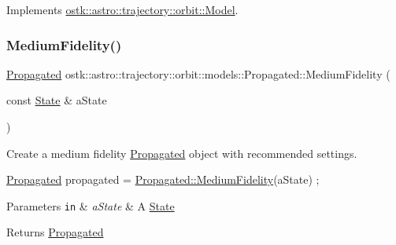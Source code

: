 Implements \hyperlink{classostk_1_1astro_1_1trajectory_1_1orbit_1_1_model_a13c5b5693dd86a072da0bd0e319bacc2}{ostk\+::astro\+::trajectory\+::orbit\+::\+Model}.

\mbox{\label{classostk_1_1astro_1_1trajectory_1_1orbit_1_1models_1_1_propagated_ab6db8fa9347666164e78942ada36928a}} 
\subsubsection{\texorpdfstring{Medium\+Fidelity()}{MediumFidelity()}}
{\footnotesize\ttfamily \hyperlink{classostk_1_1astro_1_1trajectory_1_1orbit_1_1models_1_1_propagated}{Propagated} ostk\+::astro\+::trajectory\+::orbit\+::models\+::\+Propagated\+::\+Medium\+Fidelity (\begin{DoxyParamCaption}\item[{const \hyperlink{classostk_1_1astro_1_1trajectory_1_1_state}{State} \&}]{a\+State }\end{DoxyParamCaption})\hspace{0.3cm}{\ttfamily [static]}}



Create a medium fidelity \hyperlink{classostk_1_1astro_1_1trajectory_1_1orbit_1_1models_1_1_propagated}{Propagated} object with recommended settings. 


\begin{DoxyCode}
\hyperlink{classostk_1_1astro_1_1trajectory_1_1orbit_1_1models_1_1_propagated_ac45b9e7bee7892a67e6eea66561e6fe6}{Propagated} propagated = \hyperlink{classostk_1_1astro_1_1trajectory_1_1orbit_1_1models_1_1_propagated_ab6db8fa9347666164e78942ada36928a}{Propagated::MediumFidelity}(aState) ;
\end{DoxyCode}
 
\begin{DoxyParams}[1]{Parameters}
\mbox{\tt in}  & {\em a\+State} & A \hyperlink{classostk_1_1astro_1_1trajectory_1_1_state}{State} \\
\hline
\end{DoxyParams}
\begin{DoxyReturn}{Returns}
\hyperlink{classostk_1_1astro_1_1trajectory_1_1orbit_1_1models_1_1_propagated}{Propagated} 
\end{DoxyReturn}
\mbox{\label{classostk_1_1astro_1_1trajectory_1_1orbit_1_1models_1_1_propagated_a71c17288a6039ddcc1a5d3e5e62e1f35}} 
